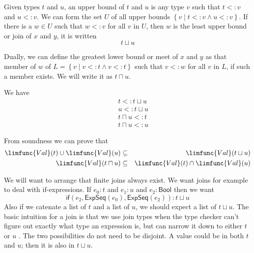 \documentclass[12pt]{article}
\begin{document}
Given types $t$ and $u$, an upper bound of $t$ and $u$ is any type $v$ such
that $t<:v$ and $u<:v$. We can form the set $U$ of all upper bounds $\left\{
v\mid t<:v\wedge u<:v\right\} $. If there is a $w\in U$ such that $w<:v$ for
all $v$ in $U$, then $w$ is the least upper bound or join of $x$ and $y$, it
is written%
\begin{equation*}
t\sqcup u
\end{equation*}

Dually, we can define the greatest lower bound or meet of $x$ and $y$ as
that member of $w$ of $L=\left\{ v\mid v<:t\wedge v<:t\right\} $ such that $%
v<:w$ for all $v$ in $L$, if such a member exists. We will write it as $%
t\sqcap u$.

We have%
\begin{eqnarray*}
&&t<:t\sqcup u \\
&&u<:t\sqcup u \\
&&t\sqcap u<:t \\
&&t\sqcap u<:u
\end{eqnarray*}

From soundness we can prove that%
\begin{eqnarray*}
\limfunc{Val}(t)\cup \limfunc{Val}(u) &\subseteq &\limfunc{Val}(t\sqcup u) \\
\limfunc{Val}(t\sqcap u) &\subseteq &\limfunc{Val}(t)\cap \limfunc{Val}(u)
\end{eqnarray*}

We will want to arrange that finite joins always exist. We want joins for
example to deal with if-expressions. If $e_{0}:t$ and $e_{1}:u$ and $e_{2}:%
\mathsf{Bool}$ then we want%
\begin{equation*}
\mathsf{if}(e_{2},\mathsf{ExpSeq}(e_{0}),\mathsf{ExpSeq}(e_{2})):t\sqcup u
\end{equation*}%
Also if we catenate a list of $t$ and a list of $u$, we should expect a list
of $t\sqcup u$. The basic intuition for a join is that we use join types
when the type checker can't figure out exactly what type an expression is,
but can narrow it down to either $t$ or $u$ . The two possibilities do not
need to be disjoint. A value could be in both $t$ and $u$; then it is also
in $t\sqcup u$.
\end{document}
